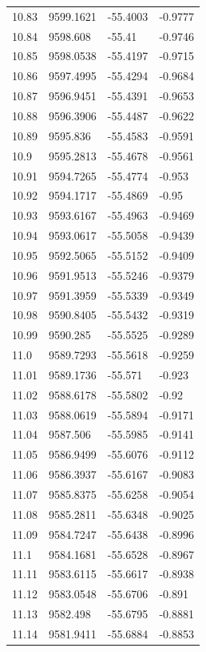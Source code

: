 \begin{table}[H]
\begin{tabular}{llll}
10.83 & 9599.1621 & -55.4003 & -0.9777 \\
10.84 & 9598.608 & -55.41 & -0.9746 \\
10.85 & 9598.0538 & -55.4197 & -0.9715 \\
10.86 & 9597.4995 & -55.4294 & -0.9684 \\
10.87 & 9596.9451 & -55.4391 & -0.9653 \\
10.88 & 9596.3906 & -55.4487 & -0.9622 \\
10.89 & 9595.836 & -55.4583 & -0.9591 \\
10.9 & 9595.2813 & -55.4678 & -0.9561 \\
10.91 & 9594.7265 & -55.4774 & -0.953 \\
10.92 & 9594.1717 & -55.4869 & -0.95 \\
10.93 & 9593.6167 & -55.4963 & -0.9469 \\
10.94 & 9593.0617 & -55.5058 & -0.9439 \\
10.95 & 9592.5065 & -55.5152 & -0.9409 \\
10.96 & 9591.9513 & -55.5246 & -0.9379 \\
10.97 & 9591.3959 & -55.5339 & -0.9349 \\
10.98 & 9590.8405 & -55.5432 & -0.9319 \\
10.99 & 9590.285 & -55.5525 & -0.9289 \\
11.0 & 9589.7293 & -55.5618 & -0.9259 \\
11.01 & 9589.1736 & -55.571 & -0.923 \\
11.02 & 9588.6178 & -55.5802 & -0.92 \\
11.03 & 9588.0619 & -55.5894 & -0.9171 \\
11.04 & 9587.506 & -55.5985 & -0.9141 \\
11.05 & 9586.9499 & -55.6076 & -0.9112 \\
11.06 & 9586.3937 & -55.6167 & -0.9083 \\
11.07 & 9585.8375 & -55.6258 & -0.9054 \\
11.08 & 9585.2811 & -55.6348 & -0.9025 \\
11.09 & 9584.7247 & -55.6438 & -0.8996 \\
11.1 & 9584.1681 & -55.6528 & -0.8967 \\
11.11 & 9583.6115 & -55.6617 & -0.8938 \\
11.12 & 9583.0548 & -55.6706 & -0.891 \\
11.13 & 9582.498 & -55.6795 & -0.8881 \\
11.14 & 9581.9411 & -55.6884 & -0.8853 \\

\end{tabular}
\end{table}

